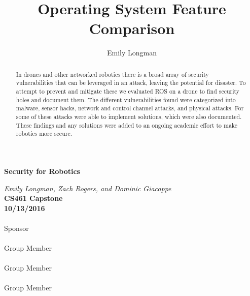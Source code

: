 \documentclass[IEEEtran,letterpaper,10pt,titlepage,draftclsnofoot,onecolumn]{article}
\title{Operating System Feature Comparison}
\author{Emily Longman}
\begin{document}
\begin{titlepage}
  \begin{center}
    \vspace*{1cm}
    
    \huge
    \textbf{Security for Robotics}      
  \vspace{0.5cm}
        
    \textit{Emily Longman, Zach Rogers, and Dominic Giacoppe}\\ 
  \vspace{0.5cm}
    \vfill
    \large
    \textbf{CS461 Capstone}\\ 
  \vspace{5mm}
    \textbf{10/13/2016}\\ 
    
  \vspace{.2in}
  \makebox[2.5in]{\hrulefill} \hspace {1.0in}\makebox[2.5in]{\hrulefill} \\
  Sponsor  \\

  \vspace{.2in}
  \makebox[2.5in]{\hrulefill} \hspace {1.0in}\makebox[2.5in]{\hrulefill} \\
  Group Member  \\

  \vspace{.2in}
  \makebox[2.5in]{\hrulefill} \hspace {1.0in}\makebox[2.5in]{\hrulefill} \\
  Group Member  \\

  \vspace{.2in}
  \makebox[2.5in]{\hrulefill} \hspace {1.0in}\makebox[2.5in]{\hrulefill} \\
  Group Member  \\
    
    \vfill
    \end{center}
\end{titlepage}

\begin{abstract}
In drones and other networked robotics there is a broad array of security vulnerabilities that can be leveraged in an attack, leaving the potential for disaster. 
To attempt to prevent and mitigate these we evaluated ROS on a drone to find security holes and document them. 
The different vulnerabilities found were categorized into malware, sensor hacks, network and control channel attacks, and physical attacks. 
For some of these attacks were able to implement solutions, which were also documented.
These findings and any solutions were added to an ongoing academic effort to make robotics more secure.
\end{abstract}
\end{document}
